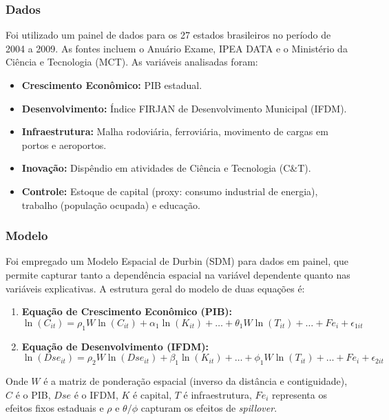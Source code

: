 \documentclass[12pt]{article}
\begin{document}
\subsubsection*{Dados}
Foi utilizado um painel de dados para os 27 estados brasileiros no período de 2004 a 2009. As fontes incluem o Anuário Exame, IPEA DATA e o Ministério da Ciência e Tecnologia (MCT). As variáveis analisadas foram:
\begin{itemize}
    \item \textbf{Crescimento Econômico:} PIB estadual.
    \item \textbf{Desenvolvimento:} Índice FIRJAN de Desenvolvimento Municipal (IFDM).
    \item \textbf{Infraestrutura:} Malha rodoviária, ferroviária, movimento de cargas em portos e aeroportos.
    \item \textbf{Inovação:} Dispêndio em atividades de Ciência e Tecnologia (C\&T).
    \item \textbf{Controle:} Estoque de capital (proxy: consumo industrial de energia), trabalho (população ocupada) e educação.
\end{itemize}

\subsubsection*{Modelo}
Foi empregado um Modelo Espacial de Durbin (SDM) para dados em painel, que permite capturar tanto a dependência espacial na variável dependente quanto nas variáveis explicativas. A estrutura geral do modelo de duas equações é:
\begin{enumerate}
    \item \textbf{Equação de Crescimento Econômico (PIB):}
    $$ \ln(C_{it}) = \rho_1 W \ln(C_{it}) + \alpha_1 \ln(K_{it}) + \dots + \theta_1 W \ln(T_{it}) + \dots + Fe_i + \epsilon_{1it} $$
    \item \textbf{Equação de Desenvolvimento (IFDM):}
    $$ \ln(Dse_{it}) = \rho_2 W \ln(Dse_{it}) + \beta_1 \ln(K_{it}) + \dots + \phi_1 W \ln(T_{it}) + \dots + Fe_i + \epsilon_{2it} $$
\end{enumerate}
Onde $W$ é a matriz de ponderação espacial (inverso da distância e contiguidade), $C$ é o PIB, $Dse$ é o IFDM, $K$ é capital, $T$ é infraestrutura, $Fe_i$ representa os efeitos fixos estaduais e $\rho$ e $\theta/\phi$ capturam os efeitos de \textit{spillover}.
\end{document}
